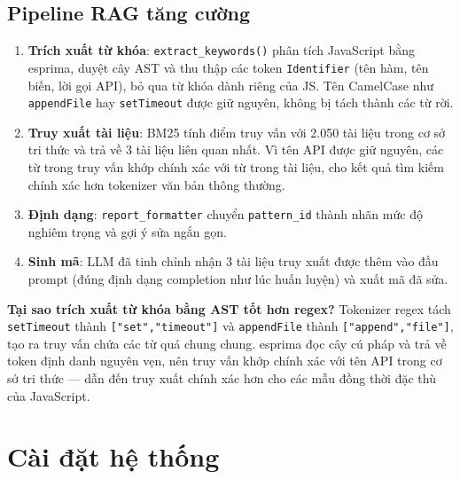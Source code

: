\documentclass[12pt]{article}
\begin{document}
\subsection{Pipeline RAG tăng cường}
\label{sec:rag}

\begin{enumerate}[leftmargin=2em]
  \item \textbf{Trích xuất từ khóa}: \texttt{extract\_keywords()} phân tích JavaScript
    bằng esprima, duyệt cây AST và thu thập các token \texttt{Identifier} (tên hàm,
    tên biến, lời gọi API), bỏ qua từ khóa dành riêng của JS.
    Tên CamelCase như \texttt{appendFile} hay \texttt{setTimeout} được giữ nguyên,
    không bị tách thành các từ rời.

  \item \textbf{Truy xuất tài liệu}: BM25 tính điểm truy vấn với 2.050 tài liệu
    trong cơ sở tri thức và trả về 3 tài liệu liên quan nhất.
    Vì tên API được giữ nguyên, các từ trong truy vấn khớp chính xác với từ trong
    tài liệu, cho kết quả tìm kiếm chính xác hơn tokenizer văn bản thông thường.

  \item \textbf{Định dạng}: \texttt{report\_formatter} chuyển \texttt{pattern\_id}
    thành nhãn mức độ nghiêm trọng và gợi ý sửa ngắn gọn.

  \item \textbf{Sinh mã}: LLM đã tinh chỉnh nhận 3 tài liệu truy xuất được thêm
    vào đầu prompt (đúng định dạng completion như lúc huấn luyện) và xuất mã đã sửa.
\end{enumerate}

\noindent\textbf{Tại sao trích xuất từ khóa bằng AST tốt hơn regex?}
Tokenizer regex tách \texttt{setTimeout} thành \texttt{["set","timeout"]} và
\texttt{appendFile} thành \texttt{["append","file"]}, tạo ra truy vấn chứa các
từ quá chung chung.
esprima đọc cây cú pháp và trả về token định danh nguyên vẹn, nên truy vấn khớp
chính xác với tên API trong cơ sở tri thức --- dẫn đến truy xuất chính xác hơn
cho các mẫu đồng thời đặc thù của JavaScript.

\section{Cài đặt hệ thống}
\label{sec:caidat}
\end{document}
